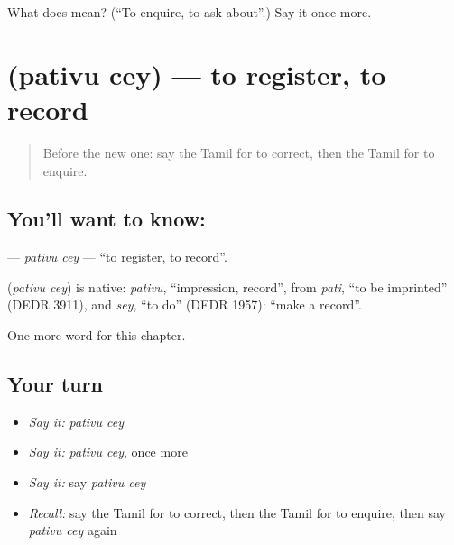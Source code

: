 \begin{tcolorbox}[breakable,colback=teal!4,colframe=teal!35!black,title={Before you move on}]
What does  mean? (\textquotedblleft{}To enquire, to ask about\textquotedblright{}.) Say it once more.
\end{tcolorbox}
\section[\texorpdfstring{\ta{பதிவு} \ta{செய்} (pativu cey)}{பதிவு செய் (pativu cey)}]{  (pativu cey) — to register, to record}

\label{lesson:TA-C227-pativu-cey}



\begin{quote}
Before the new one: say the Tamil for to correct, then the Tamil for to enquire.
\end{quote}

\subsection*{You'll want to know:  }
\textbf{ } — \emph{pativu cey} — \textquotedblleft{}to register, to record\textquotedblright{}.

\begin{cousinweb}
\textbf{ } (\emph{pativu cey}) is native: \emph{pativu}, \textquotedblleft{}impression, record\textquotedblright{}, from \emph{pati}, \textquotedblleft{}to be imprinted\textquotedblright{} (DEDR 3911), and \emph{sey}, \textquotedblleft{}to do\textquotedblright{} (DEDR 1957): \textquotedblleft{}make a record\textquotedblright{}.
\end{cousinweb}

\begin{grammarlens}[title={What you've built}]
One more word for this chapter.
\end{grammarlens}

\subsection*{Your turn}
\begin{itemize}
\raggedright
  \item \emph{Say it:} \emph{pativu cey}
  \item \emph{Say it:} \emph{pativu cey}, once more
  \item \emph{Say it:} say \emph{pativu cey}
  \item \emph{Recall:} say the Tamil for to correct, then the Tamil for to enquire, then say \emph{pativu cey} again
\end{itemize}

